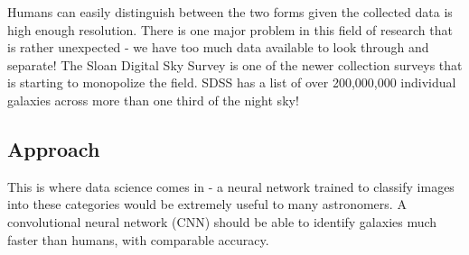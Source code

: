 Humans can easily distinguish between the two forms given the collected data is high enough resolution. 
There is one major problem in this field of research that is rather unexpected - we have too much data available to look through and separate! 
The Sloan Digital Sky Survey is one of the newer collection surveys that is starting to monopolize the field. SDSS has a list of over 200,000,000 individual galaxies across more than one third of the night sky\cite{SDSS}!

\subsection{Approach}
This is where data science comes in - a neural network trained to classify images into these categories would be extremely useful to many astronomers. 
A convolutional neural network (CNN) should be able to identify galaxies much faster than humans, with comparable accuracy.












